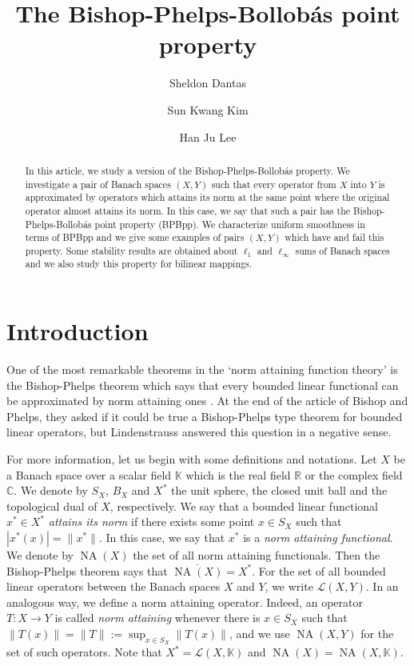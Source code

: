 \documentclass[12pt,a4paper]{amsart}
\title[The BPBpp]
{The Bishop-Phelps-Bollob\'as point property}
\author[S. Dantas]{Sheldon Dantas}
\author[S. K. Kim]{Sun Kwang Kim}
\author[H. J. Lee]{Han Ju Lee}
\date{}
\theoremstyle{definition}
\DeclareMathOperator{\na}{NA}
\numberwithin{equation}{section}
\newcommand{\R}{\mathbb{R}} %
\newcommand{\C}{\mathbb{C}} %
\newcommand{\K}{\mathbb{K}} %
\def\K{{\mathbb K}}
\def\R{{\mathbb R}}
\def\C{{\mathbb C}}
\begin{document}
\begin{abstract}
In this article, we study a version of the Bishop-Phelps-Bollob\'as property. We investigate a pair of Banach spaces $(X, Y)$ such that every operator from $X$ into $Y$ is approximated by operators which attains its norm at the same point where the original operator almost attains its norm. In this case, we say that such a pair has the Bishop-Phelps-Bollob\'as point property (BPBpp). We characterize uniform smoothness in terms of BPBpp and we give some examples of pairs $(X, Y)$ which have and fail this property. Some stability results are obtained about $\ell_1$ and $\ell_\infty$ sums of Banach spaces and we also study this property for bilinear mappings.
 \end{abstract}


\maketitle





\section{Introduction}
\par

One of the most remarkable theorems in the `norm attaining function theory' is the Bishop-Phelps theorem which says that every bounded linear functional can be approximated by norm attaining ones \cite{BP}. At the end of the article of Bishop and Phelps, they asked if it could be true a Bishop-Phelps type theorem for bounded linear operators, but Lindenstrauss \cite{Lind} answered this question in a negative sense. 

 For more information, let us begin with some definitions and notations. Let $X$ be a Banach space over a scalar field $\K$ which is the real field  $\R$ or the  complex field  $\C$. We denote by $S_X$, $B_X$ and $X^*$ the unit sphere, the closed unit ball and the topological dual of $X$, respectively. We say that a bounded linear functional $x^* \in X^*$ {\it attains its norm} if there exists some point $x \in S_X$ such that $|x^*(x)| = \|x^*\|$. In this case, we say that $x^*$ is a {\it norm attaining functional}. We denote by $\na(X)$ the set of all norm attaining functionals. Then the Bishop-Phelps theorem \cite{BP} says that $\overline{\na(X)} = X^*$.  For the set of all bounded linear operators between the Banach spaces $X$ and $Y$, we write $\mathcal{L}(X, Y)$.  In an analogous way, we define a norm attaining operator. Indeed, an operator $T: X \longrightarrow Y$ is called {\it norm attaining} whenever there is $x \in S_X$ such that $\|T(x)\|= \|T\| := \sup_{x \in S_X} \|T(x)\|$, and we use $\na(X, Y)$ for the set of such operators. Note that $X^*=\mathcal{L}(X, \K)$ and $\na(X)=\na(X,\K)$.
\end{document}
